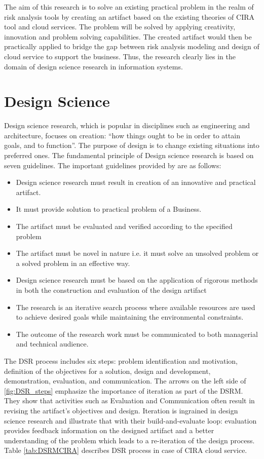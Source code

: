 \documentclass[a4paper,twoside,10pt]{report}
\begin{document}
The aim of this research is to solve an existing practical problem in the realm of risk analysis tools by creating an artifact based on the existing theories of  CIRA tool and cloud services. The problem will be solved by applying creativity, innovation and problem solving capabilities. The created artifact would then be practically applied to bridge the gap between risk analysis modeling and design of cloud service to support the business. Thus, the research clearly lies in the domain of design science research in information systems.

\section{Design Science}\label{DesignSc}

Design science research, which is popular in disciplines such as engineering and architecture, focuses on creation: ``how things ought to be in order to attain goals, and to function''. The purpose of design is to change existing situations into preferred ones. The fundamental principle of Design science research is based on seven guidelines. The important guidelines provided by \cite{Hevner:2004:DSI:2017212.2017217} are as follows:

\begin{itemize}
	\item Design science research must result in creation of an innovative and practical artifact.
	\item It must provide solution to practical problem of a Business.
	\item The artifact must be evaluated and verified according to the specified problem
	\item The artifact must be novel in nature i.e. it must solve an unsolved problem or a solved problem in an effective way.
	\item Design science research must be based on the application of rigorous methods in both the construction and evaluation of the design artifact
	\item The research is an iterative search process where available resources are used to achieve desired goals while maintaining the environmental constraints.
	\item The outcome of the research work must be communicated to both managerial and technical audience.
\end{itemize}

The DSR process includes six steps: problem identification and motivation, definition of the objectives for a solution, design and development, demonstration, evaluation, and communication. The arrows on the left side of \ref{fig:DSR_steps} emphasize the importance of iteration as part of the DSRM. They show that activities such as Evaluation and Communication often result in revising the artifact's objectives and design. Iteration is ingrained in design science research and \cite{Hevner:2004:DSI:2017212.2017217} illustrate that with their build-and-evaluate loop: evaluation provides feedback information on the designed artifact and a better understanding of the problem which leads to a re-iteration of the design process. 
Table \ref{tab:DSRMCIRA} describes DSR process in case of CIRA cloud service.
\end{document}
